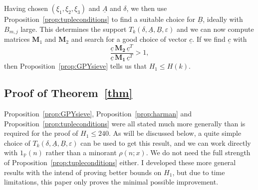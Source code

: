 \documentclass{amsart}
\numberwithin{equation}{section}
\begin{document}
\medskip Having chosen $(\xi_1,\xi_2,\xi_3)$ and $\underline{A}$ and $\delta$, we then use Proposition~\ref{prop:tupleconditions} to find a suitable choice for $\underline{B}$, ideally with $B_{m,j}$ large. This determines the support $T_k(\delta,\underline{A},\underline{B},\varepsilon)$ and we can now compute matrices $\mathbf{M}_1$ and $\mathbf{M}_2$ and search for a good choice of vector $\underline{c}$. If we find $\underline{c}$ with $$\frac{\underline{c} \, \mathbf{M_2} \,  \underline{c}^T}{\underline{c} \, \mathbf{M_1} \, \underline{c}^T}>1,$$
then Proposition~\ref{prop:GPYsieve} tells us that $H_1 \leq H(k)$.

\subsection{Proof of Theorem~\ref{thm}}

Proposition~\ref{prop:GPYsieve}, Proposition~\ref{prop:harman} and Proposition~\ref{prop:tupleconditions} were all stated much more generally than is required for the proof of $H_1 \leq 240$. As will be discussed below, a quite simple choice of $T_k(\delta,\underline{A},\underline{B},\varepsilon)$ can be used to get this result, and we can work directly with $1_{\mathbb{P}}(n)$ rather than a minorant $\rho(n;x)$. We   do not need the full strength of Proposition~\ref{prop:tupleconditions} either. I developed these more general results with the intend of proving better bounds on $H_1$, but due to time limitations, this paper only proves the minimal possible improvement.
\end{document}
